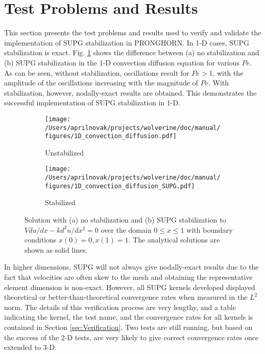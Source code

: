 \documentclass[10pt]{article}
\numberwithin{equation}{section} %
\begin{document}
\section{Test Problems and Results}

This section presents the test problems and results used to verify and validate the implementation of SUPG stabilization in PRONGHORN. In 1-D cases, SUPG stabilization is exact. Fig. \ref{fig:1D} shows the difference between (a) no stabilization and (b) SUPG stabilization in the 1-D convection diffusion equation for various \(Pe\). As can be seen, without stabilization, oscillations result for \(Pe>1\), with the amplitude of the oscillations increasing with the magnitude of \(Pe\). With stabilization, however, nodally-exact results are obtained. This demonstrates the successful implementation of SUPG stabilization in 1-D. 

\begin{figure}[H]
\centering
\begin{subfigure}{.45\textwidth}
  \centering
  \texttt{[image: /Users/aprilnovak/projects/wolverine/doc/manual/figures/1D\_convection\_diffusion.pdf]}
  \caption{Unstabilized}
\end{subfigure}
\begin{subfigure}{.45\textwidth}
  \centering
  \texttt{[image: /Users/aprilnovak/projects/wolverine/doc/manual/figures/1D\_convection\_diffusion\_SUPG.pdf]}
  \caption{Stabilized}
\end{subfigure}
\caption{Solution with (a) no stabilization and (b) SUPG stabilization to \(V du/dx-kd^2u/dx^2=0\) over the domain \(0\leq x\leq 1\) with boundary conditions \(x(0)=0, x(1)=1\). The analytical solutions are shown as solid lines.}
\label{fig:1D}
\end{figure}

In higher dimensions, SUPG will not always give nodally-exact results due to the fact that velocities are often skew to the mesh and obtaining the representative element dimension is non-exact. However, all SUPG kernels developed displayed theoretical or better-than-theoretical convergence rates when measured in the \(L^2\) norm. The details of this verification process are very lengthy, and a table indicating the kernel, the test name, and the convergence rates for all kernels is contained in Section \ref{sec:Verification}. Two tests are still running, but based on the success of the 2-D tests, are very likely to give correct convergence rates once extended to 3-D.\newline 
\end{document}
